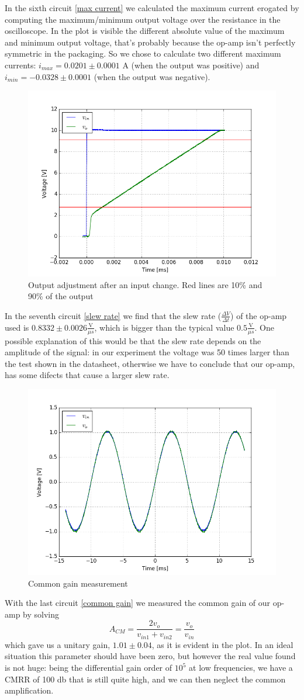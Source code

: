 In the sixth circuit \eqref{max current} we calculated the maximum current erogated by computing the maximum/minimum output voltage over the resistance in the oscilloscope. In the plot is visible the different absolute value of the maximum and minimum output voltage, that's probably because the op-amp isn't perfectly symmetric in the packaging. So we chose to calculate two different maximum currents: $i_{max} = 0.0201 \pm 0.0001$ A (when the output was positive) and $i_{min} = -0.0328 \pm 0.0001$ (when the output was negative).
\begin{figure}[H]
\centering
\includegraphics[width=.6\textwidth]{3/Slew_Ratio.png}
\caption{Output adjustment after an input change. Red lines are 10\% and 90\% of the output}
\end{figure}
In the seventh circuit \eqref{slew rate} we find that the slew rate ($\frac{\Delta V}{\Delta t}$) of the op-amp used is $0.8332 \pm 0.0026 \frac{\text{V}}{\mu s}$, which is bigger than the typical value $0.5 \frac{\text{V}}{\mu s}$. One possible explanation of this would be that the slew rate depends on the amplitude of the signal: in our experiment the voltage was 50 times larger than the test shown in the datasheet, otherwise we have to conclude that our op-amp, has some difects that cause a larger slew rate.
\begin{figure}[H]
\centering
\includegraphics[width=.7\textwidth]{3/Amplification_in_common_mode.png}
\caption{Common gain measurement}
\end{figure}
With the last circuit \eqref{common gain} we measured the common gain of our op-amp by solving
\[A_{CM} = \frac{2 v_{o}}{v_{in1} + v_{in2}} = \frac{v_o}{v_{in}}\]
which gave us a unitary gain, $1.01 \pm 0.04 $, as it is evident in the plot. In an ideal situation this parameter should have been zero, but however the real value found is not huge: being the differential gain order of $10^5$ at low frequencies, we have a CMRR of 100 db that is still quite high, and we can then neglect the common amplification.
